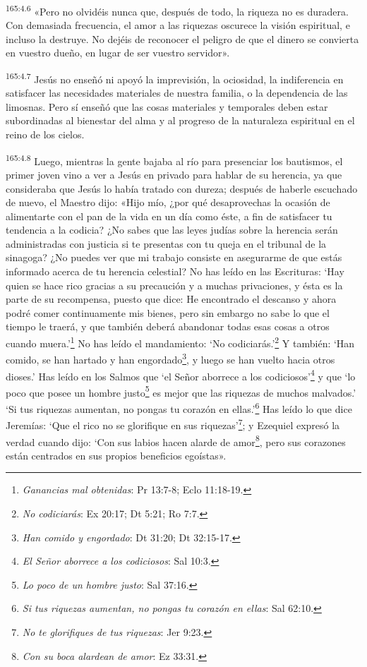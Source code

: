 \par
\textsuperscript{165:4.6} «Pero no olvidéis nunca que, después de todo, la riqueza no es duradera. Con demasiada frecuencia, el amor a las riquezas oscurece la visión espiritual, e incluso la destruye. No dejéis de reconocer el peligro de que el dinero se convierta en vuestro dueño, en lugar de ser vuestro servidor».

\par
\textsuperscript{165:4.7} Jesús no enseñó ni apoyó la imprevisión, la ociosidad, la indiferencia en satisfacer las necesidades materiales de nuestra familia, o la dependencia de las limosnas. Pero sí enseñó que las cosas materiales y temporales deben estar subordinadas al bienestar del alma y al progreso de la naturaleza espiritual en el reino de los cielos.

\par
\textsuperscript{165:4.8} Luego, mientras la gente bajaba al río para presenciar los bautismos, el primer joven vino a ver a Jesús en privado para hablar de su herencia, ya que consideraba que Jesús lo había tratado con dureza; después de haberle escuchado de nuevo, el Maestro dijo: «Hijo mío, ¿por qué desaprovechas la ocasión de alimentarte con el pan de la vida en un día como éste, a fin de satisfacer tu tendencia a la codicia? ¿No sabes que las leyes judías sobre la herencia serán administradas con justicia si te presentas con tu queja en el tribunal de la sinagoga? ¿No puedes ver que mi trabajo consiste en asegurarme de que estás informado acerca de tu herencia celestial? No has leído en las Escrituras: `Hay quien se hace rico gracias a su precaución y a muchas privaciones, y ésta es la parte de su recompensa, puesto que dice: He encontrado el descanso y ahora podré comer continuamente mis bienes, pero sin embargo no sabe lo que el tiempo le traerá, y que también deberá abandonar todas esas cosas a otros cuando muera.'\footnote{\textit{Ganancias mal obtenidas}: Pr 13:7-8; Eclo 11:18-19.} No has leído el mandamiento: `No codiciarás.'\footnote{\textit{No codiciarás}: Ex 20:17; Dt 5:21; Ro 7:7.} Y también: `Han comido, se han hartado y han engordado\footnote{\textit{Han comido y engordado}: Dt 31:20; Dt 32:15-17.}, y luego se han vuelto hacia otros dioses.' Has leído en los Salmos que `el Señor aborrece a los codiciosos'\footnote{\textit{El Señor aborrece a los codiciosos}: Sal 10:3.} y que `lo poco que posee un hombre justo\footnote{\textit{Lo poco de un hombre justo}: Sal 37:16.} es mejor que las riquezas de muchos malvados.' `Si tus riquezas aumentan, no pongas tu corazón en ellas.'\footnote{\textit{Si tus riquezas aumentan, no pongas tu corazón en ellas}: Sal 62:10.} Has leído lo que dice Jeremías: `Que el rico no se glorifique en sus riquezas'\footnote{\textit{No te glorifiques de tus riquezas}: Jer 9:23.}; y Ezequiel expresó la verdad cuando dijo: `Con sus labios hacen alarde de amor\footnote{\textit{Con su boca alardean de amor}: Ez 33:31.}, pero sus corazones están centrados en sus propios beneficios egoístas».

